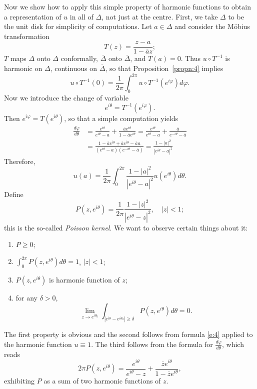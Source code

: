 \documentclass[a4paper,11pt]{article}
\begin{document}
Now we show how to apply this simple property of harmonic functions to
obtain a representation of $u$ in all of $\Delta$, not just at the
centre.  First, we take $\Delta$ to be the unit disk for simplicity of 
computations.  Let $a \in \Delta$ and consider the M\"obius 
transformation
$$
T(z) = \frac{z-a}{1-\overline{a}z};
$$
$T$ maps $\Delta$ onto $\Delta$ conformally, $\overline{\Delta}$ onto
$\overline{\Delta}$, and $T(a) = 0$.  Thus $u \circ T^{-1}$ is
harmonic on $\Delta$, continuous on $\overline{\Delta}$, so that
Proposition~\ref{propn:4} implies
$$
u \circ T^{-1}(0) = \frac{1}{2\pi} \int_0^{2\pi} u \circ
T^{-1}(e^{i\varphi}) d\varphi.
$$
Now we introduce the change of variable
$$
e^{i\theta} = T^{-1}(e^{i\varphi}).
$$
Then $e^{i\varphi} = T(e^{i\theta})$, so that a simple computation
yields
$$
\begin{aligned}
  \frac{d \varphi}{d\theta}
  &= \frac{e^{i\theta}}{e^{i\theta}-a} 
  + \frac{\overline{a} e^{i\theta}}{1-\overline{a} e^{i\theta}}
  = \frac{e^{i\theta}}{e^{i\theta}-a} 
  + \frac{\overline{a}}{e^{-i\theta}-\overline{a}} \\
  &= \frac{1-\overline{a}e^{i\theta} + \overline{a} e^{i\theta} -
    \overline{a} a}{(e^{i\theta}-a)(e^{-i\theta}-\overline{a})}
  = \frac{1-|a|^2}{|e^{i\theta} - a|^2}
\end{aligned}
$$
Therefore,
$$
u(a) = \frac{1}{2\pi} \int_0^{2\pi} \frac{1-|a|^2}{|e^{i\theta} -
  a|^2} u(e^{i\theta}) d\theta.
$$
Define
\begin{equation}
  \label{e:4}
  P(z, e^{i\theta}) = \frac{1}{2\pi} \frac{1-|z|^2}{|e^{i\theta} -
    z|^2}, \quad |z| < 1;
\end{equation}
this is the so-called \emph{Poisson kernel}.  We want to observe
certain things about it:
\begin{enumerate}
\item $P \ge 0$;
\item $\int_0^{2\pi} P(z, e^{i\theta}) d\theta = 1$, $|z| < 1$;
\item $P(z, e^{i\theta})$ is harmonic function of $z$;
\item for any $\delta > 0$,
  $$
  \lim_{z \to e^{i\theta_0}} \int_{|e^{i\theta} - e^{i\theta_0}|
    \ge \delta} P(z, e^{i\theta}) d\theta = 0.
  $$
\end{enumerate}
The first property is obvious and the second follows from formula
\eqref{e:4} applied to the harmonic function $u \equiv 1$.  The third
follows from the formula for $\frac{d\varphi}{d\theta}$, which reads
$$
2\pi P(z, e^{i\theta}) = \frac{e^{i\theta}}{e^{i\theta}-z}
+ \frac{\overline{z}e^{i\theta}}{1-\overline{z}e^{i\theta}},
$$
exhibiting $P$ as a sum of two harmonic functions of $z$.
\end{document}
